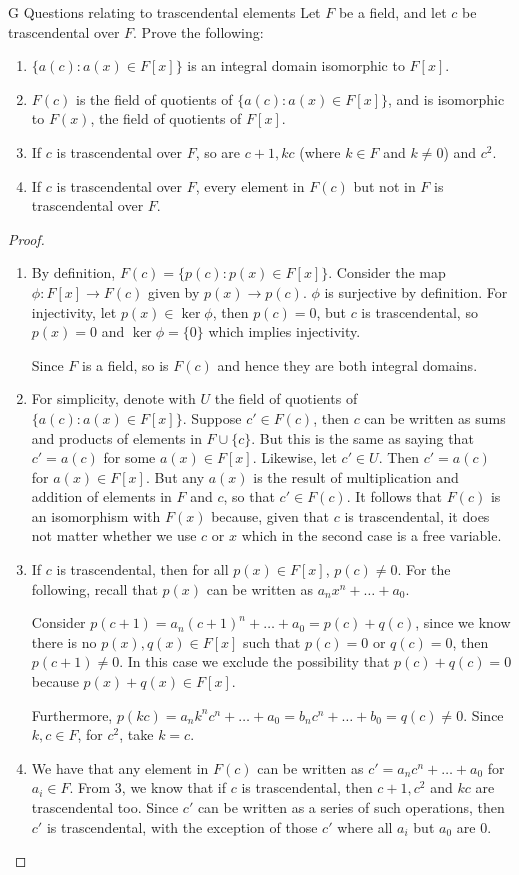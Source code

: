 \begin{exercise}{G Questions relating to trascendental elements}
Let $F$ be a field, and let $c$ be trascendental over $F$. Prove the following:
\begin{enumerate}
    \item $\{a(c):a(x)\in F[x]\}$ is an integral domain isomorphic to $F[x]$.
    \item $F(c)$ is the field of quotients of $\{a(c):a(x)\in F[x]\}$, and is isomorphic to $F(x)$, the field of quotients of $F[x]$.
    \item If $c$ is trascendental over $F$, so are $c+1,kc$ (where $k\in F$ and $k\neq0$) and $c^2$.
    \item If $c$ is trascendental over $F$, every element in $F(c)$ but not in $F$ is trascendental over $F$.
\end{enumerate}
\end{exercise}
\begin{proof}
 \begin{enumerate}
     \item By definition, $F(c)=\{p(c):p(x)\in F[x]\}$. Consider the map $\phi:F[x]\rightarrow F(c)$ given by $p(x)\rightarrow p(c)$. $\phi$ is surjective by definition. For injectivity, let $p(x)\in \ker\phi$, then $p(c)=0$, but $c$ is trascendental, so $p(x)=0$ and $\ker\phi=\{0\}$ which implies injectivity.

     Since $F$ is a field, so is $F(c)$ and hence they are both integral domains.
     \item For simplicity, denote with $U$ the field of quotients of $\{a(c):a(x)\in F[x]\}$. Suppose $c'\in F(c)$, then $c$ can be written as sums and products of elements in $F\cup\{c\}$. But this is the same as saying that $c'=a(c)$ for some $a(x)\in F[x]$. Likewise, let $c'\in U$. Then $c'=a(c)$ for $a(x)\in F[x]$. But any $a(x)$ is the result of multiplication and addition of elements in $F$ and $c$, so that $c'\in F(c)$. It follows that $F(c)$ is an isomorphism with $F(x)$ because, given that $c$ is trascendental, it does not matter whether we use $c$ or $x$ which in the second case is a free variable.
     \item If $c$ is trascendental, then for all $p(x)\in F[x]$, $p(c)\neq 0$. For the following, recall that $p(x)$ can be written as $a_nx^n+\dots+a_0$. 
     
     Consider $p(c+1)=a_n(c+1)^n+\dots+a_0=p(c)+q(c)$, since we know there is no $p(x),q(x)\in F[x]$ such that $p(c)=0$ or $q(c)=0$, then $p(c+1)\neq 0$. In this case we exclude the possibility that $p(c)+q(c)=0$ because $p(x)+q(x)\in F[x]$.

     Furthermore, $p(kc)=a_nk^nc^n+\dots+a_0=b_nc^n+\dots+b_0=q(c)\neq 0$. Since $k,c\in F$, for $c^2$, take $k=c$.
     \item We have that any element in $F(c)$ can be written as $c'=a_nc^n+\dots+a_0$ for $a_i\in F$. From 3, we know that if $c$ is trascendental, then $c+1,c^2$ and $kc$ are trascendental too. Since $c'$ can be written as a series of such operations, then $c'$ is trascendental, with the exception of those $c'$ where all $a_i$ but $a_0$ are 0.
 \end{enumerate}
\end{proof}